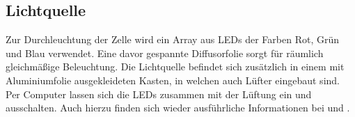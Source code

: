 \subsection{Lichtquelle}
\label{sec:light}
Zur Durchleuchtung der Zelle wird ein Array aus LEDs der Farben Rot, Grün und Blau verwendet. Eine davor gespannte Diffusorfolie sorgt für räumlich gleichmäßige Beleuchtung. Die Lichtquelle befindet sich zusätzlich in einem mit Aluminiumfolie ausgekleideten Kasten, in welchen auch Lüfter eingebaut sind. Per Computer lassen sich die LEDs zusammen mit der Lüftung ein und ausschalten. Auch hierzu finden sich wieder ausführliche Informationen bei \cite{buchner} und \cite{heberle}.


% 
% 
% 
% 
